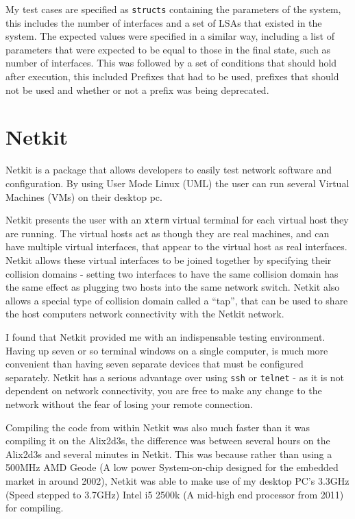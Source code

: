 \documentclass[12pt]{report}
\begin{document}
My test cases are specified as \texttt{structs} containing the parameters of
the system, this includes the number of interfaces and a set of LSAs that
existed in the system. The expected values were specified in a similar way,
including a list of parameters that were expected to be equal to those in the
final state, such as number of interfaces. This was followed by a set of
conditions that should hold after execution, this included Prefixes that had to
be used, prefixes that should not be used and whether or not a prefix was being
deprecated. 

\section{Netkit} 
Netkit is a package that allows developers to easily test network software and
configuration. By using User Mode Linux (UML)  the user can run several Virtual Machines (VMs)
 on their desktop pc. 

Netkit presents the user with an \texttt{xterm} virtual terminal for each
virtual host they are running. The virtual hosts act as though they are real
machines, and can have multiple virtual interfaces, that appear to the virtual
host as real interfaces. Netkit allows these virtual interfaces to be joined
together by specifying their collision domains - setting two interfaces to have
the same collision domain has the same effect as plugging two hosts into the
same network switch. Netkit also allows a special type of collision domain
called a ``tap'', that can be used to share the host computers network
connectivity with the Netkit network.

I found that Netkit provided me with an indispensable testing environment.
Having up seven or so terminal windows on a single computer, is much more
convenient than having seven separate devices that must be configured
separately. Netkit has a serious advantage over using \texttt{ssh} or
\texttt{telnet} - as it is not dependent on network connectivity, you are free
to make any change to the network without the fear of losing your remote
connection.   

Compiling the code from within Netkit was also much faster than it was
compiling it on the Alix2d3s, the difference was between several hours on the
Alix2d3s and several minutes in Netkit. This was because rather than using a
500MHz AMD Geode (A low power System-on-chip designed for the embedded market
in around 2002), Netkit was able to make use of my desktop PC's 3.3GHz (Speed
stepped to 3.7GHz) Intel i5 2500k (A mid-high end processor from 2011) for
compiling. 
\end{document}
